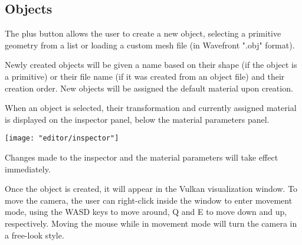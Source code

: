 \subsection{Objects}

The plus button allows the user to create a new object, selecting a primitive geometry from a list or loading a custom mesh file (in Wavefront ".obj" format).

Newly created objects will be given a name based on their shape (if the object is a primitive) or their file name (if it was created from an object file) and their creation order. New objects will be assigned the default material upon creation.

When an object is selected, their transformation and currently assigned material is displayed on the inspector panel, below the material parameters panel.

\texttt{[image: "editor/inspector"]}

Changes made to the inspector and the material parameters will take effect immediately.

Once the object is created, it will appear in the Vulkan visualization window. To move the camera, the user can right-click inside the window to enter movement mode, using the WASD keys to move around, Q and E to move down and up, respectively. Moving the mouse while in movement mode will turn the camera in a free-look style.
